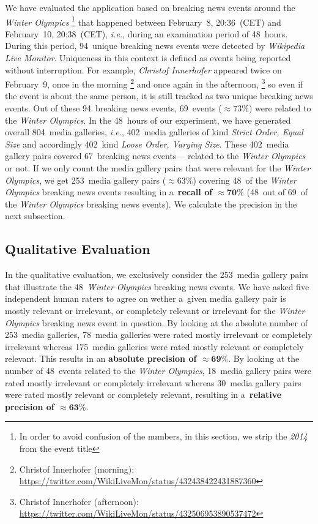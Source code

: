 \documentclass{sig-alternate-somus}
\newcommand{\inlinelistingsize}{\fontsize{8pt}{11pt}}
\let\oldurl\url
\renewcommand{\url}[1]{\inlinelistingsize\oldurl{#1}}
\begin{document}
We have evaluated the application based on breaking news events
around the \emph{Winter Olympics}%
\footnote{In order to avoid confusion of the numbers,
in this section, we strip the \emph{2014} from the event title}
that happened between February~8, 20:36~(CET) and February~10, 20:38~(CET),
\emph{i.e.}, during an examination period of 48~hours.
During this period, 94~unique breaking news events
were detected by \emph{Wikipedia Live Monitor}.
Uniqueness in this context is defined as events being
reported without interruption.
For example, \emph{Christof Innerhofer} appeared twice on February~9,
once in the morning%
\footnote{Christof Innerhofer (morning):
\url{https://twitter.com/WikiLiveMon/status/432438422431887360}}
and once again in the afternoon,%
\footnote{Christof Innerhofer (afternoon):
\url{https://twitter.com/WikiLiveMon/status/432506953890537472}}
so even if the event is about the same person,
it is still tracked as two unique breaking news events.
Out of these 94~breaking news events,
69~events (${\approx}73\%$) were
related to the \emph{Winter Olympics}.
In the 48~hours of our experiment,
we have generated overall 804~media galleries,
\emph{i.e.}, 402~media galleries of kind \emph{Strict Order, Equal Size}
and accordingly 402~kind \emph{Loose Order, Varying Size}.
These 402~media gallery pairs covered 67~breaking news events---%
related to the \emph{Winter Olympics} or not.
If we only count the media gallery pairs that were relevant
for the \emph{Winter Olympics},
we get 253~media gallery pairs (${\approx}63\%$)
covering 48~of the \emph{Winter Olympics} breaking news events
resulting in a~\textbf{recall of $\mathbf{{\approx}70\%}$}
(48~out of 69~of the \emph{Winter Olympics} breaking news events).
We calculate the precision in the next subsection.

\subsection{Qualitative Evaluation}

In the qualitative evaluation, we exclusively consider the 
253~media gallery pairs that illustrate the
48~\emph{Winter Olympics} breaking news events.
We have asked five independent human raters to agree on
wether a~given media gallery pair is mostly relevant or irrelevant,
or completely relevant or irrelevant for the 
\emph{Winter Olympics} breaking news event in question.
By looking at the absolute number of 253~media galleries,
78~media galleries were rated mostly irrelevant
or completely irrelevant
whereas 175~media galleries were rated mostly relevant
or completely relevant.
This results in an \textbf{absolute precision of $\mathbf{{\approx}69\%}$}.
By looking at the number of 48~events related to the \emph{Winter Olympics},
18~media gallery pairs were rated mostly irrelevant
or completely irrelevant
whereas 30~media gallery pairs were rated mostly relevant
or completely relevant, resulting in
a~\textbf{relative precision of $\mathbf{{\approx}63\%}$}.
\end{document}
